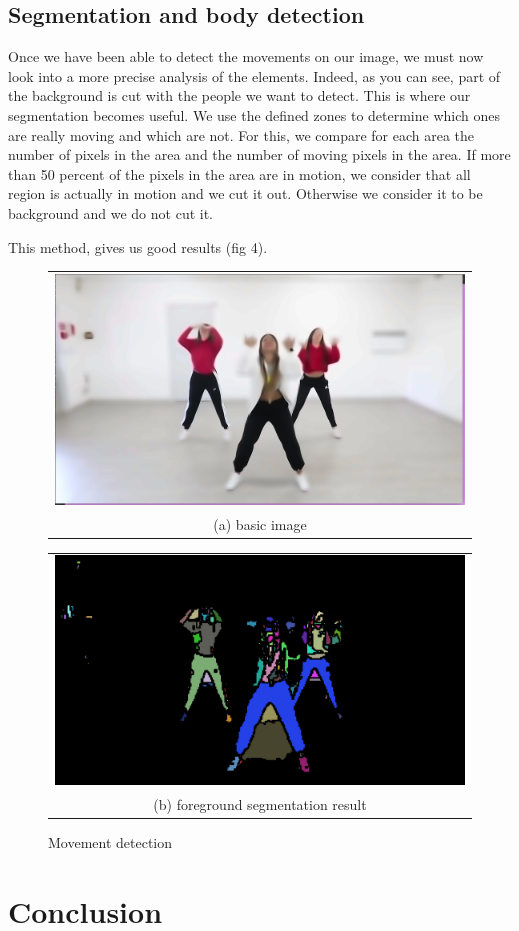 \documentclass[conference]{IEEEtran}
\begin{document}
\subsection{Segmentation and body detection}

Once we have been able to detect the movements on our image, we must now look into a more precise analysis of the elements. Indeed, as you can see, part of the background is cut with the people we want to detect. This is where our segmentation becomes useful. We use the defined zones to determine which ones are really moving and which are not. For this, we compare for each area the number of pixels in the area and the number of moving pixels in the area. If more than 50 percent of the pixels in the area are in motion, we consider that all region is actually in motion and we cut it out. Otherwise we consider it to be background and we do not cut it. 

This method, gives us good results (fig 4).

\begin{figure}[h!]
  \centering
  \begin{tabular}{@{}c@{}}
    \includegraphics[width=0.4\linewidth]{fig5.png} \\[\abovecaptionskip]
    \small (a) basic image
  \end{tabular}
  \begin{tabular}{@{}c@{}}
    \includegraphics[width=0.4\linewidth]{fig10.png} \\[\abovecaptionskip]
    \small (b) foreground segmentation result
  \end{tabular}
  \caption{Movement detection}
  \label{fig 3}
\end{figure}

\section{Conclusion}
\end{document}
